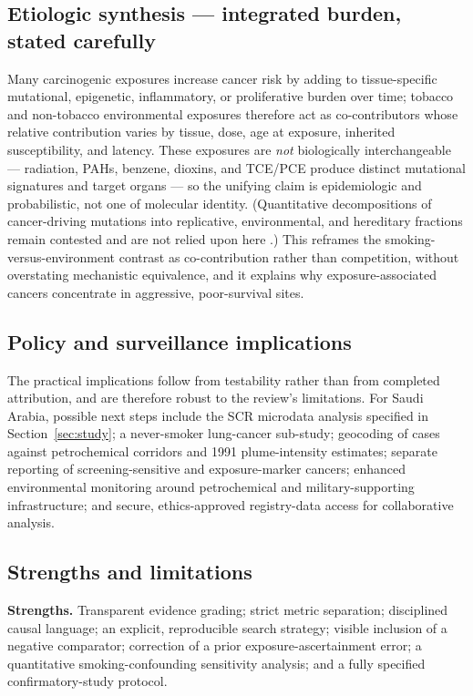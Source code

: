 \documentclass[3p,times]{elsarticle}
\begin{document}
\subsection{Etiologic synthesis --- integrated burden, stated carefully}
Many carcinogenic exposures increase cancer risk by adding to tissue-specific mutational, epigenetic, inflammatory, or proliferative burden over time; tobacco and non-tobacco environmental exposures therefore act as co-contributors whose relative contribution varies by tissue, dose, age at exposure, inherited susceptibility, and latency. These exposures are \emph{not} biologically interchangeable --- radiation, PAHs, benzene, dioxins, and TCE/PCE produce distinct mutational signatures and target organs --- so the unifying claim is epidemiologic and probabilistic, not one of molecular identity. (Quantitative decompositions of cancer-driving mutations into replicative, environmental, and hereditary fractions remain contested and are not relied upon here \citep{tlv2017,wu2016}.) This reframes the smoking-versus-environment contrast as co-contribution rather than competition, without overstating mechanistic equivalence, and it explains why exposure-associated cancers concentrate in aggressive, poor-survival sites.

\subsection{Policy and surveillance implications}
The practical implications follow from testability rather than from completed attribution, and are therefore robust to the review's limitations. For Saudi Arabia, possible next steps include the SCR microdata analysis specified in Section~\ref{sec:study}; a never-smoker lung-cancer sub-study; geocoding of cases against petrochemical corridors and 1991 plume-intensity estimates; separate reporting of screening-sensitive and exposure-marker cancers; enhanced environmental monitoring around petrochemical and military-supporting infrastructure; and secure, ethics-approved registry-data access for collaborative analysis.

\subsection{Strengths and limitations}\label{sec:limits}
\textbf{Strengths.} Transparent evidence grading; strict metric separation; disciplined causal language; an explicit, reproducible search strategy; visible inclusion of a negative comparator; correction of a prior exposure-ascertainment error; a quantitative smoking-confounding sensitivity analysis; and a fully specified confirmatory-study protocol.
\end{document}
